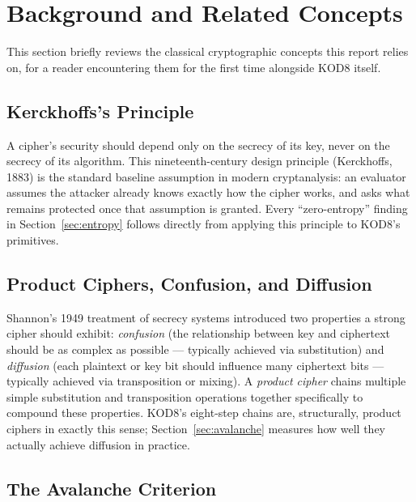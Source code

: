 \documentclass[11pt]{article}
\begin{document}
\section{Background and Related Concepts}

This section briefly reviews the classical cryptographic concepts this
report relies on, for a reader encountering them for the first time
alongside KOD8 itself.

\subsection{Kerckhoffs's Principle}

A cipher's security should depend only on the secrecy of its key, never
on the secrecy of its algorithm. This nineteenth-century design
principle (Kerckhoffs, 1883) is the standard baseline assumption in
modern cryptanalysis: an evaluator assumes the attacker already knows
exactly how the cipher works, and asks what remains protected once that
assumption is granted. Every ``zero-entropy'' finding in
Section~\ref{sec:entropy} follows directly from applying this
principle to KOD8's primitives.

\subsection{Product Ciphers, Confusion, and Diffusion}

Shannon's 1949 treatment of secrecy systems introduced two properties a
strong cipher should exhibit: \emph{confusion} (the relationship
between key and ciphertext should be as complex as possible --- typically
achieved via substitution) and \emph{diffusion} (each plaintext or key
bit should influence many ciphertext bits --- typically achieved via
transposition or mixing). A \emph{product cipher} chains multiple
simple substitution and transposition operations together specifically
to compound these properties. KOD8's eight-step chains are, structurally,
product ciphers in exactly this sense; Section~\ref{sec:avalanche}
measures how well they actually achieve diffusion in practice.

\subsection{The Avalanche Criterion}
\label{sec:avalanche-criterion-bg}
\end{document}
